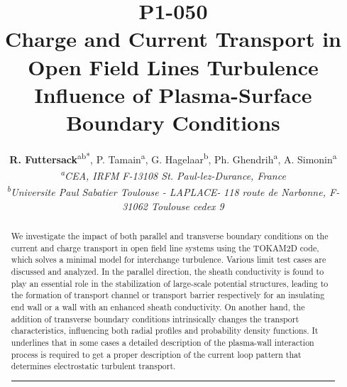 \documentclass[a4paper,12pt]{article} %
\title{
\vspace{-50pt}
\hfill\large{\textbf{P1-050}}\\[1cm] \textbf{\large{Charge and Current Transport
in Open Field Lines Turbulence}\\
\normalsize{Influence of Plasma-Surface Boundary Conditions}}}
\author{\normalsize{\textbf{R. Futtersack}\textsuperscript{ab*}, P.
Tamain\textsuperscript{a}, G. Hagelaar\textsuperscript{b},
 Ph. Ghendrih\textsuperscript{a}, 
 A. Simonin\textsuperscript{a}}\\
\small{\emph{\textsuperscript{a}CEA, IRFM}
\emph{F-13108 St. Paul-lez-Durance, France}}\\
\small{\emph{\textsuperscript{b}Universite Paul Sabatier Toulouse - LAPLACE-}
\emph{118 route de Narbonne, F-31062 Toulouse cedex 9}}}
\date{}
\begin{document}
\linespread{1}
\maketitle

\thispagestyle{empty}
\linespread{1.6}
\renewcommand{\absnamepos}{flushleft}
\renewcommand{\abstractnamefont}{\normalfont\textbf}
\renewcommand{\abstracttextfont}{\normalsize}

\renewcommand{\cftdotsep}{\cftnodots}
\renewcommand{\cftfigpresnum}{\textbf{Figure~}}
\renewcommand{\cftfigaftersnum}{:}
\renewcommand{\cftbeforefigskip}{1em}


\setlength{\absparindent}{0cm}
\setlength{\absparsep}{0cm}
\setlength{\absleftindent}{0pt}
\setlength{\absrightindent}{0pt}

\begin{abstract}
We investigate the impact of both parallel and transverse boundary conditions on the current and charge transport
in open field line systems using the TOKAM2D code, which solves a minimal model for interchange turbulence. 
Various limit test cases are discussed and analyzed. In the parallel direction,
the sheath conductivity is found to play an essential role in the stabilization of large-scale potential structures,
leading to the formation of transport channel or transport barrier respectively for an insulating end wall or a wall 
with an enhanced sheath conductivity. On another hand, the addition of transverse boundary conditions intrinsically changes
the transport characteristics, influencing both radial profiles and probability density functions. It underlines that 
in some cases a detailed description of the plasma-wall interaction process is required to get a proper description of
 the current loop pattern that determines electrostatic turbulent transport.\\
\hrule
\end{abstract}

\newenvironment{correct}%
{\noindent\ignorespaces\linespread{1}}%
{}
\end{document}
